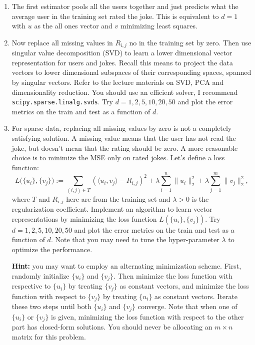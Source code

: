 \documentclass{article}
\newcommand{\1}{\mathbf{1}}
\begin{document}
\begin{enumerate}
\item The first estimator pools all the users together and just predicts what the average user in the training set rated the joke. This is equivalent to $d=1$ with $u$ as the all ones vector and $v$ minimizing least squares.    

\item Now replace all missing values in $R_{i,j}$ no in the training set by zero. Then use singular value decomposition (SVD) to learn a lower dimensional vector representation for users and jokes. Recall this means to project the data vectors to lower dimensional subspaces of their corresponding spaces, spanned by singular vectors. Refer to the lecture materials on SVD, PCA and dimensionality reduction. You should use an efficient solver, I recommend \texttt{scipy.sparse.linalg.svds}. Try $d=1,2,5,10,20,50$ and plot the error metrics on the train and test as a function of $d$. 

\item For sparse data, replacing all missing values by zero is not a completely satisfying solution. A missing value means that the user has not read the joke, but doesn't mean that the rating should be zero. A more reasonable choice is to minimize the MSE only on rated jokes. Let's define a loss function:
\[
  L\Big(\{u_i\},\{v_j\}\Big) := \sum_{(i,j)\in T} (\langle u_i,v_j\rangle - R_{i,j})^2
  + \lambda \sum_{i=1}^n \|u_i\|_2^2 + \lambda \sum_{j=1}^m \|v_j\|_2^2,
\]
where $T$ and $R_{i,j}$ here are from the training set and $\lambda > 0$ is the regularization coefficient. Implement an algorithm to learn vector representations by minimizing the loss function $L(\{u_i\},\{v_j\})$.
Try $d=1,2,5,10,20,50$ and plot the error metrics on the train and test as a function of $d$. 
Note that you may need to tune the hyper-parameter $\lambda$ to optimize the performance.

{\bf Hint:} you may want to employ an alternating minimization scheme. First, randomly initialize $\{u_i\}$ and $\{v_j\}$. Then minimize the loss function with respective to $\{u_i\}$ by treating $\{v_j\}$ as constant vectors, and minimize the loss function with respect to $\{v_j\}$ by treating $\{u_i\}$ as constant vectors. Iterate these two steps until both $\{u_i\}$ and $\{v_j\}$ converge. Note that when one of $\{u_i\}$ or $\{v_j\}$ is given, minimizing the loss function with respect to the other part has closed-form solutions. You should never be allocating an $m \times n$ matrix for this problem. 


\end{enumerate}
\end{document}
